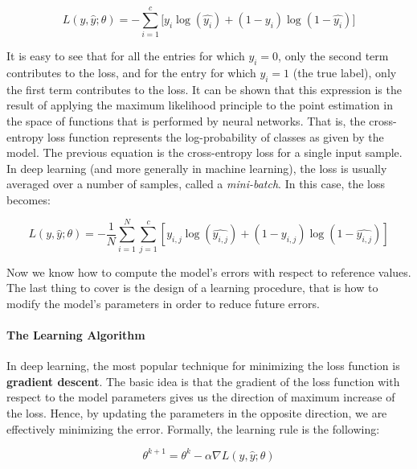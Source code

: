 \documentclass[../main.tex]{subfiles}
\begin{document}
    \begin{equation}
        L(y, \hat{y}; \theta) = - \sum_{i = 1}^{c} \lbrack y_{i} \log(\hat{y_{i}}) + (1 - y_{i})\log(1 - \hat{y_{i}}) \rbrack
    \end{equation}

    It is easy to see that for all the entries for which $y_{i} = 0$, only the second term contributes to the loss, and for the entry
    for which $y_{i} = 1$ (the true label), only the first term contributes to the loss. It can be shown that this expression is the result
    of applying the maximum likelihood principle to the point estimation in the space of functions that is performed by neural networks. That is,
    the cross-entropy loss function represents the log-probability of classes as given by the model.
    The previous equation is the cross-entropy loss for a single input sample. In deep learning (and more generally in machine learning),
    the loss is usually averaged over a number of samples, called a \textit{mini-batch}. In this case, the loss becomes:

    \begin{equation}
        L(y, \hat{y}; \theta) = - \frac{1}{N} \sum_{i = 1}^{N} \sum_{j = 1}^{c} \left[ y_{i, j} \log(\hat{y_{i, j}}) + (1 - y_{i, j})\log(1 - \hat{y_{i, j}})  \right]
    \end{equation}

    Now we know how to compute the model's errors with respect to reference values. The last thing to cover is the design of a learning
    procedure, that is how to modify the model's parameters in order to reduce future errors.

    \paragraph{The Learning Algorithm}
    In deep learning, the most popular technique for minimizing the loss function is \textbf{gradient descent}. The basic idea
    is that the gradient of the loss function with respect to the model parameters gives us the direction of maximum increase
    of the loss. Hence, by updating the parameters in the opposite direction, we are effectively minimizing the error.
    Formally, the learning rule is the following:

    \begin{equation}\label{eq:gradientdescent}
        \theta^{k+1} = \theta^{k} - \alpha \nabla L(y, \hat{y}; \theta)
    \end{equation}
\end{document}
